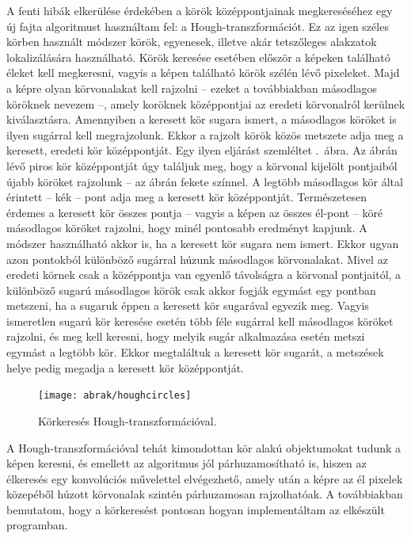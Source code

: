 \documentclass[a4paper,12pt]{article}
\begin{document}
A fenti hibák elkerülése érdekében a körök középpontjainak megkereséséhez egy új fajta  algoritmust használtam fel: a Hough-transzformációt. Ez az igen széles körben használt módszer  körök, egyenesek, illetve akár tetszőleges alakzatok lokalizálására használható. Körök keresése esetében először a képeken található éleket kell megkeresni, vagyis a képen található körök szélén lévő pixeleket. Majd a képre olyan körvonalakat kell rajzolni -- ezeket a továbbiakban másodlagos köröknek nevezem --, amely koröknek középpontjai az eredeti körvonalról kerülnek kiválasztásra. Amennyiben a keresett kör sugara ismert, a másodlagos  köröket is ilyen sugárral kell megrajzolunk. Ekkor a rajzolt körök közös metszete adja meg a keresett, eredeti kör középpontját. Egy ilyen eljárást szemléltet  .~ábra. Az ábrán lévő piros kör középpontját úgy találjuk meg, hogy a körvonal kijelölt pontjaiból újabb köröket rajzolunk -- az ábrán fekete színnel. A legtöbb másodlagos kör által érintett -- kék -- pont adja meg a keresett kör középpontját. Természetesen érdemes a keresett kör összes pontja -- vagyis a képen az összes él-pont -- köré másodlagos köröket rajzolni, hogy minél pontosabb eredményt kapjunk. A módszer használható akkor is, ha a keresett kör sugara nem ismert. Ekkor ugyan azon pontokból különböző sugárral húzunk másodlagos körvonalakat. Mivel az eredeti körnek csak a középpontja van egyenlő távolságra a körvonal pontjaitól, a különböző sugarú másodlagos körök csak akkor fogják egymást egy pontban metszeni, ha a sugaruk éppen a keresett kör sugarával egyezik meg. Vagyis ismeretlen sugarú kör keresése esetén több féle sugárral kell másodlagos köröket rajzolni, és meg kell keresni, hogy  melyik sugár alkalmazása esetén metszi egymást a legtöbb kör. Ekkor megtaláltuk a keresett kör sugarát, a metszések helye pedig megadja a keresett kör középpontját.

\begin{figure}[htbp]
\center
\texttt{[image: abrak/houghcircles]}
\caption{Körkeresés Hough-transzformációval.}
\label{fig:houghcircles}
\end{figure}




A Hough-transzformációval tehát kimondottan  kör alakú objektumokat tudunk a képen keresni, és emellett az algoritmus jól párhuzamosítható is, hiszen az élkeresés egy konvolúciós művelettel elvégezhető, amely után a képre az él pixelek közepéből húzott körvonalak szintén párhuzamosan rajzolhatóak. A továbbiakban bemutatom, hogy a körkeresést pontosan hogyan implementáltam az elkészült programban.
\end{document}
